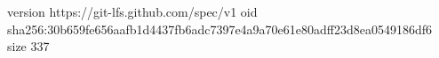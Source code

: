 version https://git-lfs.github.com/spec/v1
oid sha256:30b659fe656aafb1d4437fb6adc7397e4a9a70e61e80adff23d8ea0549186df6
size 337
